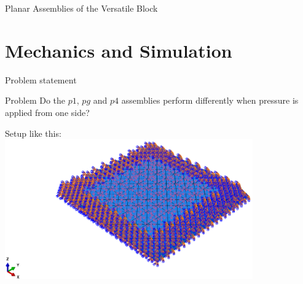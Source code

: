 \documentclass{beamer}
\numberwithin{equation}{aufgabe}
\begin{document}
\begin{frame}{Planar Assemblies of the Versatile Block}
\begin{center}
{{            }
        }
    \end{center}
\end{frame}

\section{Mechanics and Simulation}
\begin{frame}{Problem statement}
    \begin{exampleblock}{Problem}
        Do the $p1$, $pg$ and $p4$ assemblies perform differently when pressure is applied from one side?\\
    \end{exampleblock}
    \pause
    Setup like this:\\
    \includegraphics[width=0.8\textwidth]{images/setup-10x10.png}
\end{frame}
\end{document}
